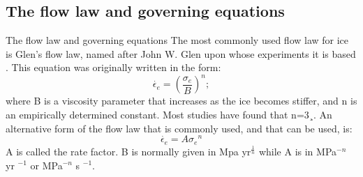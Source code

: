 \documentclass[11pt]{beamer}
\begin{document}
	\subsection{The flow law and governing equations}
		\begin{frame}{The flow law and governing equations}
		\justifying
		The most commonly used ﬂow law for ice is Glen’s ﬂow law, named after John W. Glen upon whose experiments it is based \cite{glen1958flow}. This equation was originally written in the form:
		\begin{equation}
			\dot{\epsilon_{e}}=({\frac{\sigma_{e}}{B}})^n;
		\end{equation}
		where B is a viscosity parameter that increases as the ice becomes stiffer, and n is an empirically determined constant. Most studies have found that n=3¸. An alternative form of the ﬂow law that is commonly used, and that can be used, is:
		\begin{equation}
			\dot{\epsilon_{e}}=A{\sigma_{e}}^n
		\end{equation}
		A is called the rate factor. B is normally given in Mpa yr$^{\frac{1}{n}}$ while A is in MPa$^{-n}$ yr $^{-1}$ or MPa$^{-n}$ s $^{-1}$.
		\end{frame}
\end{document}
